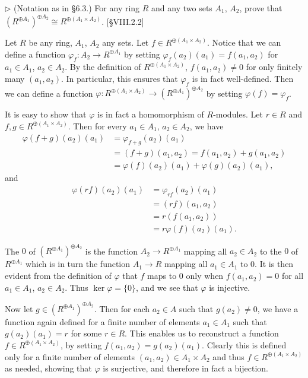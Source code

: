 \begin{problem}
	$\triangleright$ (Notation as in \S 6.3.) For any ring $R$ and any two sets $A_1$, $A_2$, prove that $(R^{\oplus A_1})^{\oplus A_2} \cong R^{\oplus(A_1 \times A_2)}$. [\S VIII.2.2]
\end{problem}

\begin{solution}
	Let $R$ be any ring, $A_1$, $A_2$ any sets. Let $f \in R^{\oplus (A_1 \times A_2)}$. Notice that we can define a function $\varphi_f: A_2 \to R^{\oplus A_1}$ by setting $\varphi_f(a_2)(a_1) = f(a_1, a_2)$ for $a_1 \in A_1$, $a_2 \in A_2$. By the definition of $R^{\oplus (A_1 \times A_2)}$, $f(a_1, a_2) \neq 0$ for only finitely many $(a_1, a_2)$. In particular, this ensures that $\varphi_f$ is in fact well-defined. Then we can define a function $\varphi: R^{\oplus (A_1 \times A_2)} \to (R^{\oplus A_1})^{\oplus A_2}$ by setting $\varphi(f) = \varphi_f$.
	
	It is easy to show that $\varphi$ is in fact a homomorphism of $R$-modules. Let $r \in R$ and $f, g \in R^{\oplus (A_1 \times A_2)}$. Then for every $a_1 \in A_1$, $a_2 \in A_2$, we have
	\begin{align*}
		\varphi(f + g)(a_2)(a_1) &= \varphi_{f+g}(a_2)(a_1) \\
		&= (f+g)(a_1, a_2) = f(a_1, a_2) + g(a_1, a_2) \\
		&= \varphi(f)(a_2)(a_1) + \varphi(g)(a_2)(a_1) \text{,}
	\end{align*}
	and
	\begin{align*}
		\varphi(rf)(a_2)(a_1) &= \varphi_{rf}(a_2)(a_1) \\
		&= (rf)(a_1, a_2) \\
		&= r(f(a_1, a_2)) \\
		&= r \varphi(f)(a_2)(a_1) \text{.}
	\end{align*}

	The $0$ of $(R^{\oplus A_1})^{\oplus A_2}$ is the function $A_2 \to R^{\oplus A_1}$ mapping all $a_2 \in A_2$ to the $0$ of $R^{\oplus A_1}$ which is in turn the function $A_1 \to R$ mapping all $a_1 \in A_1$ to $0$. It is then evident from the definition of $\varphi$ that $f$ maps to $0$ only when $f(a_1, a_2) = 0$ for all $a_1 \in A_1$, $a_2 \in A_2$. Thus $\ker \varphi = \{ 0 \}$, and we see that $\varphi$ is injective.
	
	Now let $g \in (R^{\oplus A_1})^{\oplus A_2}$. Then for each $a_2 \in A$ such that $g(a_2) \neq 0$, we have a function again defined for a finite number of elements $a_1 \in A_1$ such that $g(a_2)(a_1) = r$ for some $r \in R$. This enables us to reconstruct a function $f \in R^{\oplus (A_1 \times A_2)}$, by setting $f(a_1, a_2) = g(a_2)(a_1)$. Clearly this is defined only for a finite number of elements $(a_1, a_2) \in A_1 \times A_2$ and thus $f \in R^{\oplus (A_1 \times A_2)}$ as needed, showing that $\varphi$ is surjective, and therefore in fact a bijection.
\end{solution}

